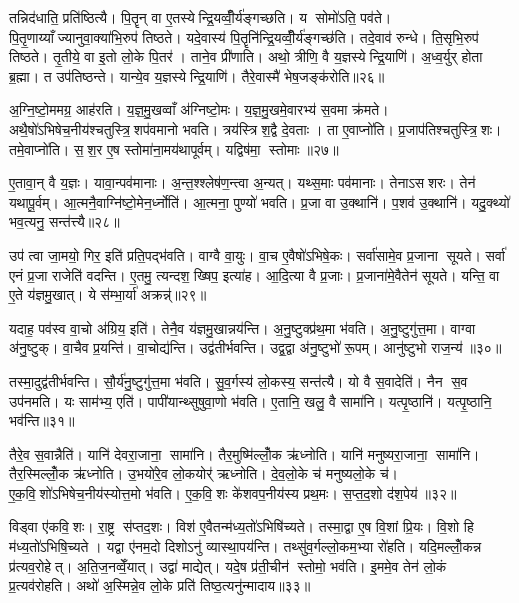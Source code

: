 तन्निद॑धाति॒ प्रति॑ष्ठित्यै। पि॒तॄन् वा ए॒तस्येन्द्रि॒यव्वीँ॒र्य॑ङ्गच्छति। य सोमो॑ऽति॒ पव॑ते। पि॒तृ॒णाय्याँज्यानुवा॒क्या॑भि॒रुप॑ तिष्ठते। यदे॒वास्य॑ पि॒तॄनि॑न्द्रि॒यव्वीँ॒र्य॑ङ्गच्छ॑ति। तदे॒वाव॑ रुन्धे। ति॒सृभि॒रुप॑ तिष्ठते। तृ॒तीये॒ वा इ॒तो लो॒के पि॒तर॑। ताने॒व प्री॑णाति। अथो॒ त्रीणि॒ वै य॒ज्ञस्येन्द्रि॒याणि॑। अ॒ध्व॒र्युर् होता ब्र॒ह्मा। त उप॑तिष्ठन्ते। यान्ये॒व य॒ज्ञस्येन्द्रि॒याणि॑। तैरे॒वास्मै॑ भेष॒जङ्क॑रोति॥२६॥\anuvakamend[प्री॒णा॒ति॒ प्र॒थ॒मो दख्षि॑णा स॒मव॑नयति धा॒रय॑तीन्द्रि॒याणि॑ च॒त्वारि॑ च]

अ॒ग्नि॒ष्टो॒ममग्र॒ आह॑रति। य॒ज्ञ॒मु॒खव्वाँ अ॑ग्निष्टो॒मः। य॒ज्ञ॒मु॒खमे॒वारभ्य॑ स॒वमा क्र॑मते। अथै॒षो॑ऽभिषेच॒नीय॑श्चतुस्त्रि॒शप॑वमानो भवति। त्रय॑स्त्रिश॒द्वै दे॒वताः। ता ए॒वाप्नो॑ति। प्र॒जाप॑तिश्चतुस्त्रि॒शः। तमे॒वाप्नो॑ति। स॒श॒र ए॒ष स्तोमा॑ना॒मय॑थापूर्वम्। यद्विष॑मा॒ स्तोमाः॥२७॥

ए॒तावा॒न् वै य॒ज्ञः। यावा॒न्पव॑मानाः। अ॒न्त॒श्श्लेष॑ण॒न्त्वा अ॒न्यत्। यथ्स॒माः पव॑मानाः। तेनाऽसशरः। तेन॑ यथापू॒र्वम्। आ॒त्मनै॒वाग्नि॑ष्टो॒मेन॒र्ध्नोति॑। आ॒त्मना॒ पुण्यो॑ भवति। प्र॒जा वा उ॒क्थानि॑। प॒शव॑ उ॒क्थानि॑। यदु॒क्थ्यो॑ भव॒त्यनु॒ सन्त॑त्त्यै॥२८॥\anuvakamend[स्तोमा प॒शव॑ उ॒क्थान्येक॑ञ्च]

उप॑ त्वा जा॒मयो॒ गिर॒ इति॑ प्रति॒पद्भ॑वति। वाग्वै वा॒युः। वा॒च ए॒वैषो॑ऽभिषे॒कः। सर्वा॑सामे॒व प्र॒जाना सूयते। सर्वा॑ एनं प्र॒जा राजेति॑ वदन्ति। ए॒तमु॒ त्यन्दश॒ ख्षिप॒ इत्या॑ह। आ॒दि॒त्या वै प्र॒जाः। प्र॒जाना॑मे॒वैतेन॑ सूयते। यन्ति॒ वा ए॒ते य॑ज्ञमु॒खात्। ये स॑म्भा॒र्या॑ अक्रन्न्॑॥२९॥

यदाह॒ पव॑स्व वा॒चो अ॑ग्रिय॒ इति॑। तेनै॒व य॑ज्ञमु॒खान्नय॑न्ति। अ॒नु॒ष्टुक्प्र॑थ॒मा भ॑वति। अ॒नु॒ष्टुगु॑त्त॒मा। वाग्वा अ॑नु॒ष्टुक्। वा॒चैव प्र॒यन्ति॑। वा॒चोद्य॑न्ति। उद्व॑तीर्भवन्ति। उद्व॒द्वा अ॑नु॒ष्टुभो॑ रू॒पम्। आनु॑ष्टुभो राज॒न्य॑॥३०॥

तस्मा॒दुद्व॑तीर्भवन्ति। सौ॒र्य॑नु॒ष्टुगु॑त्त॒मा भ॑वति। सु॒व॒र्गस्य॑ लो॒कस्य॒ सन्त॑त्यै। यो वै स॒वादेति॑। नैन स॒व उप॑नमति। यः साम॑भ्य॒ एति॑। पापी॑यान्थ्सुषुवा॒णो भ॑वति। ए॒तानि॒ खलु॒ वै सामा॑नि। यत्पृ॒ष्ठानि॑। यत्पृ॒ष्ठानि॒ भव॑न्ति॥३१॥

तैरे॒व स॒वान्नैति॑। यानि॑ देवरा॒जाना॒ सामा॑नि। तैर॒मुष्मि॑ल्लोँ॒क ऋ॑ध्नोति। यानि॑ मनुष्यरा॒जाना॒ सामा॑नि। तैर॒स्मिल्लोँ॒क ऋ॑ध्नोति। उ॒भयो॑रे॒व लो॒कयोर्॑ ऋध्नोति। दे॒व॒लो॒के च॑ मनुष्यलो॒के च॑। ए॒क॒वि॒शो॑ऽभिषेच॒नीय॑स्योत्त॒मो भ॑वति। ए॒क॒वि॒शः के॑शवप॒नीय॑स्य प्रथ॒मः। स॒प्त॒द॒शो द॑श॒पेय॑॥३२॥

विड्वा ए॑कवि॒शः। रा॒ष्ट्र स॑प्तद॒शः। विश॑ ए॒वैतन्म॑ध्य॒तो॑ऽभिषि॑च्यते। तस्मा॒द्वा ए॒ष वि॒शां प्रि॒यः। वि॒शो हि म॑ध्य॒तो॑ऽभिषि॒च्यते। यद्वा ए॑नम॒दो दिशोऽनु॑ व्यास्था॒पय॑न्ति। तथ्सु॑व॒र्गल्लो॒कम॒भ्या रो॑हति। यदि॒मल्लोँ॒कन्न प्र॑त्यव॒रोहेत्। अ॒ति॒ज॒नव्वेँ॒यात्। उद्वा॑ माद्येत्। यदे॒ष प्र॑ती॒चीन॑ स्तोमो॒ भव॑ति। इ॒ममे॒व तेन॑ लो॒कं प्र॒त्यव॑रोहति। अथो॑ अ॒स्मिन्ने॒व लो॒के प्रति॑ तिष्ठ॒त्यनु॑न्मादाय॥३३॥\anuvakamend[अक्र॑न्राज॒न्यो॑ भव॑न्ति दश॒पेयो॑ माद्ये॒त्रीणि॑ च]

